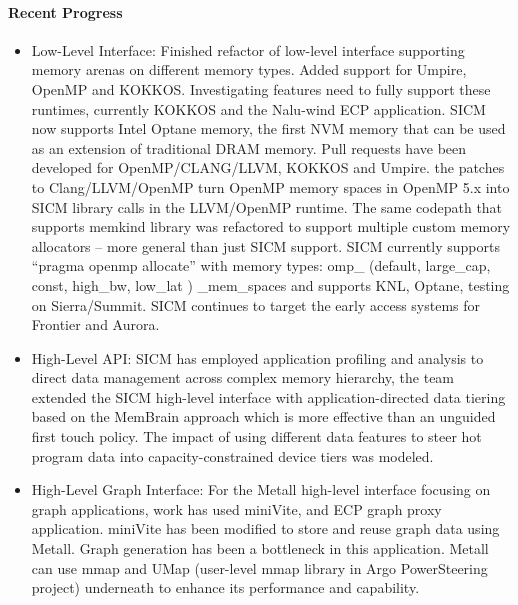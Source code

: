 \paragraph{Recent Progress} \leavevmode 
\begin{itemize}
	\item  Low-Level Interface: Finished refactor of low-level interface supporting memory arenas on different memory types. Added support for Umpire, OpenMP and KOKKOS. Investigating features need to fully support these runtimes, currently KOKKOS and the Nalu-wind ECP application. SICM now supports Intel Optane memory, the first NVM memory that can be used as an extension of traditional DRAM memory.
	Pull requests have been developed for OpenMP/CLANG/LLVM, KOKKOS and Umpire. the patches to Clang/LLVM/OpenMP turn OpenMP memory spaces in OpenMP 5.x into SICM library calls in the LLVM/OpenMP runtime. The same codepath that supports memkind library was refactored to support multiple custom memory allocators – more general than just SICM support.
	SICM currently supports ``pragma openmp allocate'' with  memory types: omp\_ (default, large\_cap, const, high\_bw, low\_lat ) \_mem\_spaces and supports KNL, Optane, testing on Sierra/Summit.  SICM continues to target the early access systems for Frontier and Aurora.
	\item High-Level API: SICM has employed application profiling and analysis to direct data management across complex memory hierarchy, the team extended the SICM high-level interface with application-directed data tiering based on the MemBrain approach which is more effective than an unguided first touch policy.  The impact of using different data features to steer hot program data into capacity-constrained device tiers was modeled.
	\item  High-Level Graph Interface: For the Metall high-level interface focusing on graph applications, work has used miniVite, and ECP graph proxy application. miniVite has been modified to store and reuse graph data using Metall.  Graph generation has been a bottleneck in this application. Metall can use mmap and UMap (user-level mmap library in Argo PowerSteering project) underneath to enhance its performance and capability.
\end{itemize}

